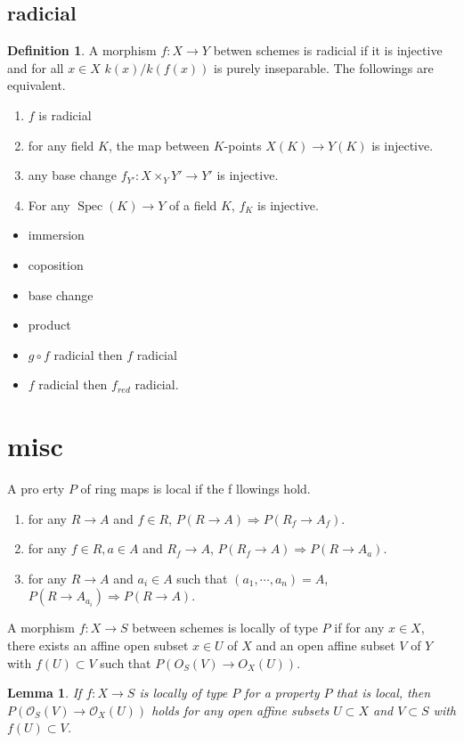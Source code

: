\documentclass[leqno]{amsart}
\DeclareMathOperator{\Spec}{Spec}
\newcommand{\oo}{\mathcal O}
\newcommand{\1}{\mathbf{1}}
\newtheorem{lem}[thm]{Lemma}
\theoremstyle{definition}
\newtheorem{defn}[thm]{Definition}
\theoremstyle{remark}
\begin{document}
\subsection{radicial}
\begin{defn}
	A morphism $f\colon X\to Y$
	betwen schemes is radicial
	if it is injective 
	and for all  $x\in X$
	$k(x)/k(f(x))$ is purely inseparable.
	The followings are equivalent.
	 \begin{enumerate}[label=(\alph*)]
		\item $f$ is radicial
		\item for any field $K$,
			the map between $K$-points
			$X(K)\to Y(K)$
			is injective.
		\item any base change
			$f_{Y'}\colon X\times_YY'\to Y'$ is injective.
		\item For any $\Spec(K)\to Y$
			of a field  $K$,
			 $f_K$ is injective.
	\end{enumerate}
\end{defn}

\begin{itemize}
	\item immersion
	\item coposition
	\item base change
	\item product
	\item $g\circ f$ radicial
		then  $f$ radicial
	\item  $f$ radicial then
		 $f_{red}$ radicial.
\end{itemize}

\section{misc}

A pro erty $P$ of ring maps is local if 
the f llowings hold.
\begin{enumerate}[label=(\alph*)]
	\item for any $R\to A$ and  $f\in R$,
		$P(R\to A)\Longrightarrow P(R_f\to A_f)$.
	\item for any  $f\in R, a\in A$ and  $R_f\to A$,
		$P(R_f\to A)\Longrightarrow P(R\to A_a)$.
	\item for any  $R\to A$ and  $a_i\in A$ 
		such that  $(a_1,\cdots,a_n)=A$,
		$P(R\to A_{a_i})\Longrightarrow P(R\to A)$.
\end{enumerate}
A morphism $f\colon X\to S$ between schemes 
is locally of type $P$ if for any  $x\in X$,
there exists an affine open subset  $x\in U$ of  $X$
and an open affine subset $V$ of $Y$ with  $f(U)\subset V$
such that $P(O_S(V)\to O_X(U))$.
\begin{lem}
	If $f\colon X\to S$ is locally of type  $P$
	for a property  $P$ that is local,
	then $P(\oo_S(V)\to \oo_X(U))$ holds
	for any open affine subsets 
	$U\subset X$ and  $V\subset S$
	with  $f(U)\subset V$.
\end{lem}

\end{document}
